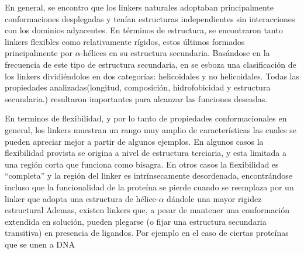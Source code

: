 En general, se encontro que los linkers naturales adoptaban principalmente conformaciones desplegadas y tenían estructuras independientes sin interacciones con los dominios adyacentes.
En términos de estructura, se encontraron tanto linkers flexibles como relativamente rígidos, estos últimos formados principalmente por $\alpha$-hélices en su estructura secundaria. 
Basándose en la frecuencia de este tipo de estructura secundaria, en \cite{george2002analysis} se esboza una clasificación de los linkers dividiéndolos en dos categorías: helicoidales y no helicoidales.
Todas las propiedades analizadas(longitud, composición, hidrofobicidad y estructura secundaria.) resultaron importantes para alcanzar las funciones deseadas.




En terminos de flexibilidad, y por lo tanto de propiedades conformacionales en general, los linkers muestran un rango muy amplio de características las cuales se pueden apreciar mejor a partir de algunos ejemplos.
En algunos casos la flexibilidad provista se origina a nivel de estructura terciaria, y esta limitada a una región corta que funciona como bisagra.%
En otros casos la flexibilidad es ``completa'' y la región del linker es intrínsecamente desordenada\cite{luo2010flexibility}, 
encontrándose incluso que la funcionalidad de la proteína se pierde cuando se reemplaza por un linker que adopta una estructura de hélice-$\alpha$ dándole una mayor rigidez estructural\cite{hrycyna1998structural}
Ademas, existen linkers que, a pesar de mantener una conformación extendida en solución, pueden plegarse (o fijar una estructura secundaria transitiva) en presencia de ligandos.
Por ejemplo en el caso de ciertas proteínas que se unen a DNA\cite{laity2000dna}


